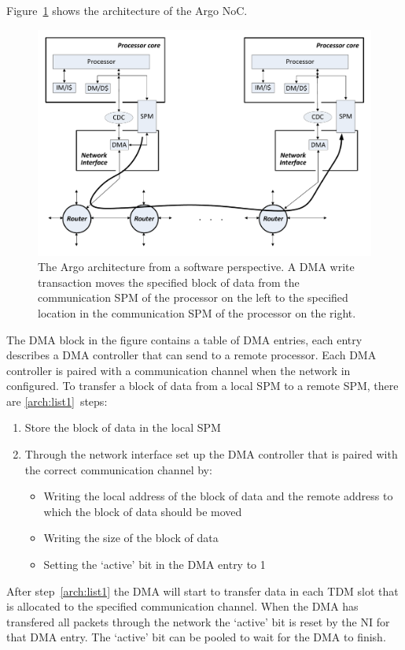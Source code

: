 \documentclass[a4paper,fontsize=10pt,twoside,DIV15,BCOR12mm,headinclude=true,footinclude=false,pagesize,bibtotoc]{scrbook}
\begin{document}
Figure~\ref{fig:argo-arch} shows the architecture of the Argo NoC.
\begin{figure}[h]
\centering
\includegraphics[width=\textwidth]{fig/argo-arch.pdf}
\caption{The Argo architecture from a software perspective.
A DMA write transaction moves the specified block of data from the
communication SPM of the processor on the left to the specified
location in the communication SPM of the processor on the right.}
\label{fig:argo-arch}
\end{figure}
The DMA block in the figure contains a table of DMA entries,
each entry describes a DMA controller that can send to a remote processor.
Each DMA controller is paired with a communication channel when the network in configured. 
To transfer a block of data from a local SPM to a remote SPM, there are \ref{arch:list1}~steps:
\begin{enumerate}
\item Store the block of data in the local SPM
\item Through the network interface set up the DMA controller that is paired with the correct communication channel by:
  \begin{itemize}
  \item Writing the local address of the block of data and the remote address to which the block of data should be moved
  \item Writing the size of the block of data
  \item Setting the `active' bit in the DMA entry to 1
  \end{itemize}
\label{arch:list1}\end{enumerate}
After step~\ref{arch:list1} the DMA will start to transfer data in each TDM slot that is allocated to the specified communication channel.
When the DMA has transfered all packets through the network the `active' bit is reset by the NI for that DMA entry. The `active' bit can be pooled to wait for the DMA to finish.
\end{document}
